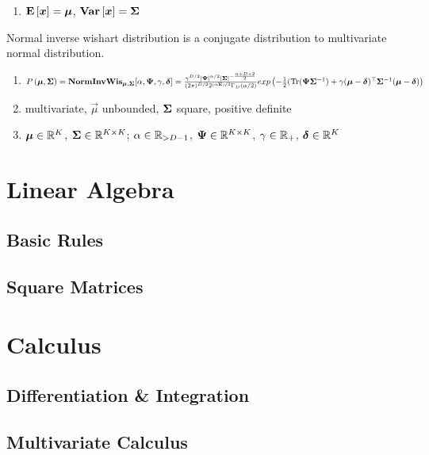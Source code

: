 \begin{description}[leftmargin=0cm]
\begin{enumerate}
		\item $\mathbf{E}\left[\boldsymbol{x}\right]=\boldsymbol{\mu}$, $\mathbf{Var}\left[\boldsymbol{x}\right]=\mathbf{\Sigma}$
	\end{enumerate}
\item[Normal Inverse Wishart] Normal inverse wishart distribution is a conjugate distribution to multivariate normal distribution.
	\begin{enumerate}
		\item $\P{\vec{\mu},\cov}=\NIW_{\vec{\mu},\cov}[\al,\vec{\Ps},\ga,\vec{\de}] \\ =\frac{\ga^{D/2}\det{\vec{\Ps}}^{\al/2}\det{\cov}^{-\frac{\al+D+2}{2}}}{(2\pi)^{D/2}2^{(\al\cov)/2}\Ga_D(\al/2)}\e{-\frac{1}{2}(\Tr(\vec{\Ps}\cov\inv)+\ga(\vec{\mu}-\vec{\de})\T\cov\inv(\vec{\mu}-\vec{\de})}$
		\item multivariate, $\vec{\mu}$ unbounded, $\mathbf{\Sigma}$ square, positive definite
		\item $\boldsymbol{\mu} \in \mathbb{R}^K$, $\mathbf{\Sigma} \in \mathbb{R}^{K \times K}$; $\alpha \in \mathbb{R}_{>D-1}$, $\boldsymbol{\Psi} \in \mathbb{R}^{K \times K}$, $\gamma \in \mathbb{R}_+$, $\boldsymbol{\delta} \in \mathbb{R}^K$
	\end{enumerate}
\end{description}

\section{Linear Algebra}
\label{section2.2}

\subsection{Basic Rules}

\subsection{Square Matrices}

\section{Calculus}
\label{section2.3}

\subsection{Differentiation \& Integration}

\subsection{Multivariate Calculus}

